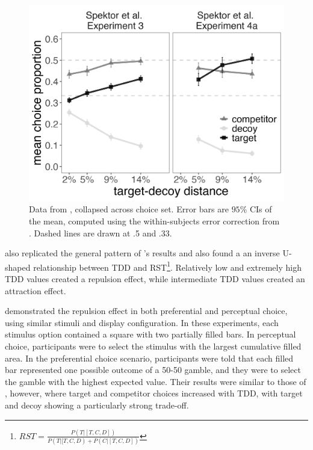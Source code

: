 \begin{figure}
   \includegraphics[width=\linewidth]{figures/spektor_data_collapsed.jpeg}
   \caption{Data from \textcite{spektorWhenGoodLooks2018b}, collapsed across choice set. Error bars are $95\%$ CIs of the mean, computed using the within-subjects error correction from \textcite{morey2008confidence}. Dashed lines are drawn at .5 and .33.}
   \label{fig:spektor_data} %
\end{figure}

\textcite{liaoInfluenceDistanceDecoy2021} also replicated the general pattern of \textcite{spektorWhenGoodLooks2018b}'s results and also found a an inverse U-shaped relationship between TDD and RST\footnote{$RST=\frac{P(T|[T,C,D])}{P(T|[T,C,D)+P(C|[T,C,D])}$}. Relatively low and extremely high TDD values created a repulsion effect, while intermediate TDD values created an attraction effect. 

\textcite{spektorRepulsionEffectPreferential2022} demonstrated the repulsion effect in both preferential and perceptual choice, using similar stimuli and display configuration. In these experiments, each stimulus option contained a square with two partially filled bars. In perceptual choice, participants were to select the stimulus with the largest cumulative filled area. In the preferential choice scenario, participants were told that each filled bar represented one possible outcome of a 50-50 gamble, and they were to select the gamble with the highest expected value. Their results were similar to those of \textcite{spektorWhenGoodLooks2018b}, however, where target and competitor choices increased with TDD, with target and decoy showing a particularly strong trade-off.

